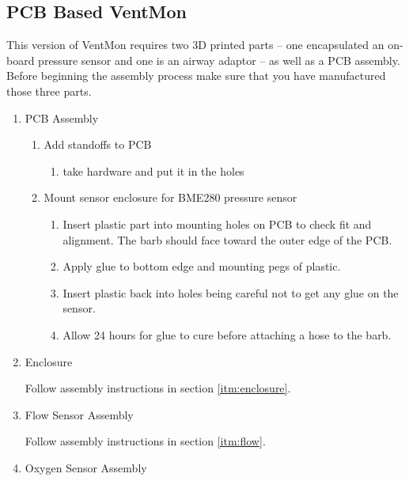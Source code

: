 \documentclass[11pt, letterpaper]{article}
\begin{document}

\subsection{PCB Based VentMon}

This version of VentMon requires two 3D printed parts  -- one encapsulated an on-board pressure sensor and one is an airway adaptor -- as well as a PCB assembly. Before beginning the assembly process make sure that you have manufactured those three parts.

\begin{enumerate}
\item
PCB Assembly

\begin{enumerate}[label=1.\arabic*]
\item Add standoffs to PCB
\begin{enumerate}[label=1.1.\arabic*]
\item take hardware and put it in the holes
\end{enumerate}

\item Mount sensor enclosure for BME280 pressure sensor
\begin{enumerate}[label=1.2.\arabic*]
\item Insert plastic part into mounting holes on PCB to check fit and alignment. The barb should face toward the outer edge of the PCB.
\item Apply glue to bottom edge and mounting pegs of plastic.
\item Insert plastic back into holes being careful not to get any glue on the sensor.
\item Allow 24 hours for glue to cure before attaching a hose to the barb.
\end{enumerate}


\end{enumerate}



\item
Enclosure

Follow assembly instructions in section \ref{itm:enclosure}.


\item
Flow Sensor Assembly

Follow assembly instructions in section \ref{itm:flow}.

\item
Oxygen Sensor Assembly


\end{enumerate}
\end{document}
